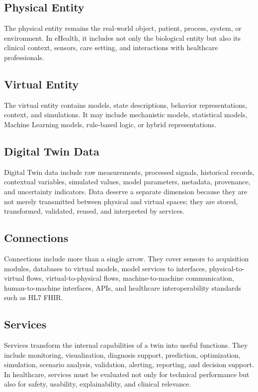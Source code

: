 \subsection*{Physical Entity}
The physical entity remains the real-world object, patient, process, system, or environment. In eHealth, it includes not only the biological entity but also its clinical context, sensors, care setting, and interactions with healthcare professionals.

\subsection*{Virtual Entity}
The virtual entity contains models, state descriptions, behavior representations, context, and simulations. It may include mechanistic models, statistical models, Machine Learning models, rule-based logic, or hybrid representations.

\subsection*{Digital Twin Data}
Digital Twin data include raw measurements, processed signals, historical records, contextual variables, simulated values, model parameters, metadata, provenance, and uncertainty indicators. Data deserve a separate dimension because they are not merely transmitted between physical and virtual spaces; they are stored, transformed, validated, reused, and interpreted by services.

\subsection*{Connections}
Connections include more than a single arrow. They cover sensors to acquisition modules, databases to virtual models, model services to interfaces, physical-to-virtual flows, virtual-to-physical flows, machine-to-machine communication, human-to-machine interfaces, APIs, and healthcare interoperability standards such as HL7 FHIR.

\subsection*{Services}
Services transform the internal capabilities of a twin into useful functions. They include monitoring, visualization, diagnosis support, prediction, optimization, simulation, scenario analysis, validation, alerting, reporting, and decision support. In healthcare, services must be evaluated not only for technical performance but also for safety, usability, explainability, and clinical relevance.

